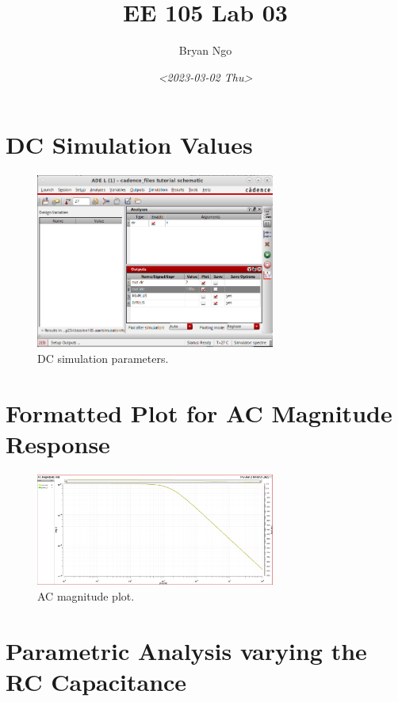 \documentclass[11pt]{article}
\author{Bryan Ngo}
\date{\textit{<2023-03-02 Thu>}}
\title{EE 105 Lab 03}
\begin{document}
\maketitle
\tableofcontents


\section{DC Simulation Values}
\label{sec:orge2886f3}

\begin{figure}[H]
\centering
\includegraphics[width=0.7\textwidth]{./dc_sim.png}
\caption{\label{fig:dc_sim}DC simulation parameters.}
\end{figure}

\section{Formatted Plot for AC Magnitude Response}
\label{sec:org501c83f}

\begin{figure}[H]
\centering
\includegraphics[width=0.7\textwidth]{./ac_sim.png}
\caption{\label{fig:ac_sim}AC magnitude plot.}
\end{figure}

\section{Parametric Analysis varying the RC Capacitance}
\label{sec:org45e9bd3}
\end{document}
